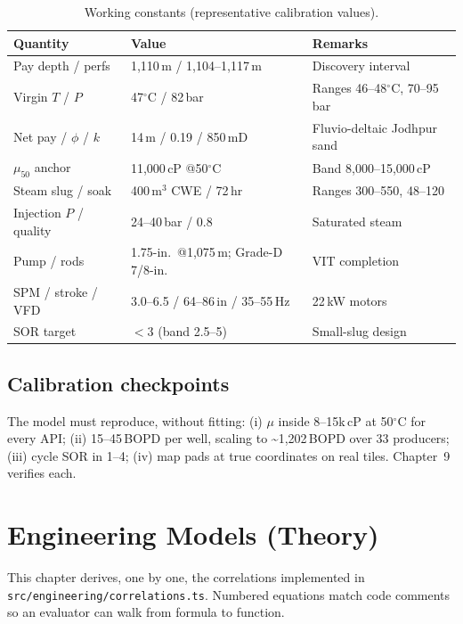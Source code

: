 \documentclass[12pt,a4paper]{report}
\begin{document}
\begin{table}[h]
\centering
\caption{Working constants (representative calibration values).\label{tab:constants}}
\begin{tabular}{lll}
\toprule
\textbf{Quantity} & \textbf{Value} & \textbf{Remarks} \\ \midrule
Pay depth / perfs & 1,110\,m / 1,104--1,117\,m & Discovery interval \\
Virgin $T$ / $P$ & 47$^\circ$C / 82\,bar & Ranges 46--48$^\circ$C, 70--95\,bar \\
Net pay / $\phi$ / $k$ & 14\,m / 0.19 / 850\,mD & Fluvio-deltaic Jodhpur sand \\
$\mu_{50}$ anchor & 11,000\,cP @50$^\circ$C & Band 8,000--15,000\,cP \\
Steam slug / soak & 400\,m$^3$ CWE / 72\,hr & Ranges 300--550, 48--120 \\
Injection $P$ / quality & 24--40\,bar / 0.8 & Saturated steam \\
Pump / rods & 1.75-in.\ @1,075\,m; Grade-D 7/8-in. & VIT completion \\
SPM / stroke / VFD & 3.0--6.5 / 64--86\,in / 35--55\,Hz & 22\,kW motors \\
SOR target & $<3$ (band 2.5--5) & Small-slug design \\
\bottomrule
\end{tabular}
\end{table}

\section{Calibration checkpoints}
The model must reproduce, without fitting: (i) $\mu$ inside 8--15k\,cP at
50$^\circ$C for every API; (ii) 15--45\,BOPD per well, scaling to
\textasciitilde1,202\,BOPD over 33 producers; (iii) cycle SOR in 1--4;
(iv) map pads at true coordinates on real tiles. Chapter~9 verifies each.

\chapter{Engineering Models (Theory)}
This chapter derives, one by one, the correlations implemented in
\texttt{src/engineering/correlations.ts}. Numbered equations match code
comments so an evaluator can walk from formula to function.
\end{document}
